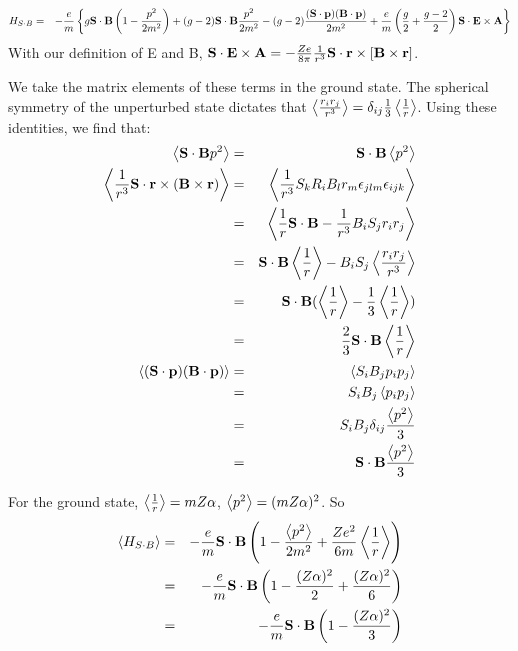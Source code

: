 \begin{eqnarray*}  
H_{S \cdot B} &=& - \frac{e}{m} \left\{
				g \mathbf{S} \cdot \mathbf{B} \left ( 1 - \frac{p^2}{2m^2} \right )
				+ (g-2) \mathbf{S} \cdot \mathbf{B} \frac{p^2}{2m^2}
				- (g-2) \frac{ (\mathbf{S} \cdot \mathbf{p}) (\mathbf{B} \cdot \mathbf{p})}{2m^2}
				+ \frac{e}{m} \left(\frac{g}{2} + \frac{g-2}{2} \right)  \mathbf{S} \cdot \mathbf{E} \times \mathbf{A}
			\right\}	
\end{eqnarray*}
With our definition of E and B, $\mathbf{S} \cdot \mathbf{E} \times \mathbf{A} = - \frac{Ze}{8\pi} \frac{1}{r^3} \mathbf{S} \cdot \mathbf{r} \times [\mathbf{B} \times \mathbf{r}]$.


We take the matrix elements of these terms in the ground state.  The spherical symmetry of the unperturbed state dictates that $\left< \frac{r_i r_j}{r^3} \right>=\delta_{ij}\frac{1}{3}\left< \frac{1}{r} \right>$.
Using these identities, we find that:
\begin{eqnarray*}
\left< \mathbf{S} \cdot \mathbf{B} p^2 \right> 
	&=& \mathbf{S} \cdot \mathbf{B} \left< p^2 \right>	\\
 \left< \frac{1}{r^3} \mathbf{S} \cdot \mathbf{r} \times (\mathbf{B} \times \mathbf{r}) \right>
	&=&	\left< \frac{1}{r^3} S_k R_i B_l r_m \epsilon_{jlm} \epsilon_{ijk} \right>	\\
	&=&	\left<  \frac{1}{r} \mathbf{S} \cdot \mathbf{B}  - \frac{1}{r^3} B_i S_j r_i r_j  \right>	\\
	&=&	\mathbf{S} \cdot \mathbf{B} \left< \frac{1}{r} \right> - B_i S_j \left< \frac{r_i r_j}{r^3} \right>	\\
	&=&	\mathbf{S} \cdot \mathbf{B}(\left< \frac{1}{r} \right> - \frac{1}{3}\left< \frac{1}{r} \right>)	\\
	&=&	\frac{2}{3} \mathbf{S} \cdot \mathbf{B}\left< \frac{1}{r} \right>\\
\left<  (\mathbf{S} \cdot \mathbf{p}) (\mathbf{B} \cdot \mathbf{p})  \right>
	&=&	\left<  S_i B_j p_i p_j  \right>	\\
	&=&	S_i B_j \left< p_i p_j \right>	\\
	&=&	S_i B_j \delta_{ij} \frac{\left< p^2 \right>}{3}  \\
	&=&	 \mathbf{S} \cdot \mathbf{B} \frac{\left< p^2 \right>}{3}
\end{eqnarray*}

For the ground state, $\left< \frac{1}{r}  \right>= mZ\alpha$, $\left< p^2 \right> = (mZ\alpha)^2$.  So 
\begin{eqnarray*}  
\left< H_{S \cdot B}  \right>
	&=& - \frac{e}{m} \mathbf{S} \cdot \mathbf{B} 
		\left ( 1 - \frac{\left< p^2 \right>}{2m^2}  + \frac{Ze^2}{6m}\left< \frac{1}{r} \right>\right )	\\
	&=&  - \frac{e}{m} \mathbf{S} \cdot \mathbf{B} \left (1 - \frac{ (Z \alpha)^2}{2} +\frac{(Z\alpha)^2}{6} \right )	\\
	&=&  - \frac{e}{m} \mathbf{S} \cdot \mathbf{B} \left (1 - \frac{(Z\alpha)^2}{3} \right )	\\
\end{eqnarray*}


